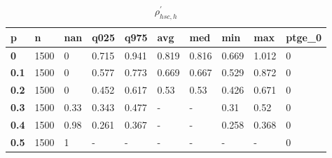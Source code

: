 \begin{table}[h]
 \centering 
\footnotesize
\caption{$\rho_{hsc,h}^\prime $}
\label{tab:alphahsch}
\begin{tabular}[h]{|l|l|l|l|l|l|l|l|l|l|
    } \hline
\textbf{ p} & \textbf{ n} & \textbf{ nan} & \textbf{ q025} & \textbf{ q975} & \textbf{ avg} & \textbf{ med} & \textbf{ min} & \textbf{ max} & \textbf{ ptge\_0}
    \\ \hline
  \textbf{  0} & 1500 &    0 & 0.715 & 0.941 & 0.819 & 0.816 & 0.669 & 1.012 & 0
    \\ \hline
  \textbf{0.1} & 1500 &    0 & 0.577 & 0.773 & 0.669 & 0.667 & 0.529 & 0.872 & 0
    \\ \hline
  \textbf{0.2} & 1500 &    0 & 0.452 & 0.617 &  0.53 &  0.53 & 0.426 & 0.671 & 0
    \\ \hline
  \textbf{0.3} & 1500 & 0.33 & 0.343 & 0.477 & - & - &  0.31 &  0.52 & 0
    \\ \hline
  \textbf{0.4} & 1500 & 0.98 & 0.261 & 0.367 & - & - & 0.258 & 0.368 & 0
    \\ \hline
  \textbf{0.5} & 1500 &    1 & - & - & - & - & - & - & 0
    \\ \hline
 \end{tabular}
 \end{table}
